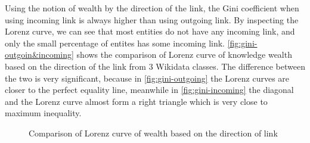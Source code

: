 
Using the notion of wealth by the direction of the link, the Gini coefficient when using incoming link is always higher than using outgoing link. By inspecting the Lorenz curve, we can see that most entities do not have any incoming link, and only the small percentage of entites has some incoming link. \autoref{fig:gini-outgoin&incoming} shows the comparison of Lorenz curve of knowledge wealth based on the direction of the link from 3 Wikidata classes. The difference between the two is very significant, because in \autoref{fig:gini-outgoing} the Lorenz curves are closer to the perfect equality line, meanwhile in \autoref{fig:gini-incoming} the diagonal and the Lorenz curve almost form a right triangle which is very close to maximum inequality.


\begin{figure}[!htbp]
    \centering 
    
    
    \caption{Comparison of Lorenz curve of wealth based on the direction of link} \label{fig:gini-outgoin&incoming}
    
\end{figure}